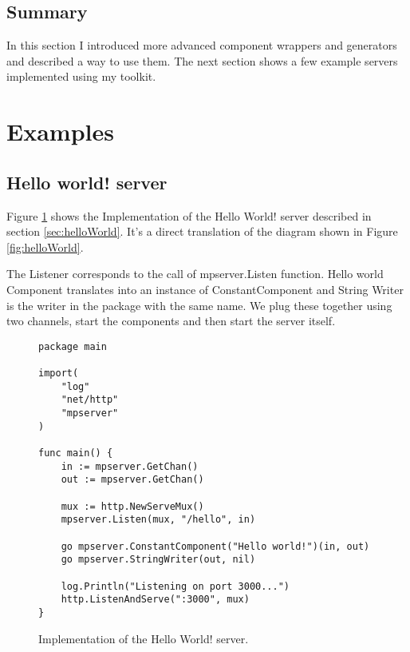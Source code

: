 \documentclass[12pt,a4paper]{article}
\begin{document}
\subsection{Summary}
In this section I introduced more advanced component wrappers and generators
and described a way to use them. The next section shows a few example
servers implemented using my toolkit.


\newpage
\section{Examples}
\label{sec:examples}
\subsection{Hello world! server}
Figure \ref{fig:HelloWorldImpl} shows the Implementation of the Hello World!
server described in section \ref{sec:helloWorld}.
It's a direct translation of the diagram shown in Figure \ref{fig:helloWorld}.

The Listener corresponds to the call of mpserver.Listen function.
Hello world Component translates into an instance of ConstantComponent
and String Writer is the writer in the package with the same name.
We plug these together using two channels, start the components 
and then start the server itself.

\begin{figure}[h]
\centering
\begin{lstlisting}
package main

import(
    "log"
    "net/http"
    "mpserver"
)

func main() {
    in := mpserver.GetChan()
    out := mpserver.GetChan()

    mux := http.NewServeMux()
    mpserver.Listen(mux, "/hello", in)

    go mpserver.ConstantComponent("Hello world!")(in, out)
    go mpserver.StringWriter(out, nil)
    
    log.Println("Listening on port 3000...")
    http.ListenAndServe(":3000", mux)
}
\end{lstlisting}
\caption[scale=1.0]{Implementation of the Hello World! server.}
\label{fig:HelloWorldImpl}
\end{figure}
\end{document}
